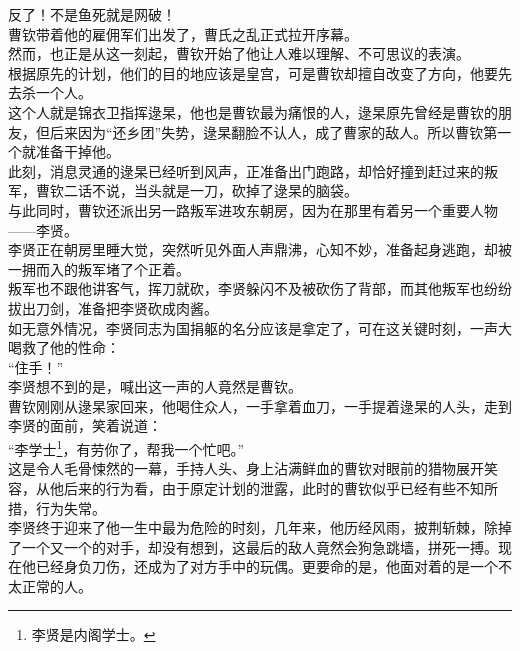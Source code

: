 \begin{multicols}{\theparacolNo}
反了！不是鱼死就是网破！\\

曹钦带着他的雇佣军们出发了，曹氏之乱正式拉开序幕。\\

然而，也正是从这一刻起，曹钦开始了他让人难以理解、不可思议的表演。\\

根据原先的计划，他们的目的地应该是皇宫，可是曹钦却擅自改变了方向，他要先去杀一个人。\\

这个人就是锦衣卫指挥逯杲，他也是曹钦最为痛恨的人，逯杲原先曾经是曹钦的朋友，但后来因为“还乡团”失势，逯杲翻脸不认人，成了曹家的敌人。所以曹钦第一个就准备干掉他。\\

此刻，消息灵通的逯杲已经听到风声，正准备出门跑路，却恰好撞到赶过来的叛军，曹钦二话不说，当头就是一刀，砍掉了逯杲的脑袋。\\

与此同时，曹钦还派出另一路叛军进攻东朝房，因为在那里有着另一个重要人物——李贤。\\

李贤正在朝房里睡大觉，突然听见外面人声鼎沸，心知不妙，准备起身逃跑，却被一拥而入的叛军堵了个正着。\\

叛军也不跟他讲客气，挥刀就砍，李贤躲闪不及被砍伤了背部，而其他叛军也纷纷拔出刀剑，准备把李贤砍成肉酱。\\

如无意外情况，李贤同志为国捐躯的名分应该是拿定了，可在这关键时刻，一声大喝救了他的性命：\\

“住手！”\\

李贤想不到的是，喊出这一声的人竟然是曹钦。\\

曹钦刚刚从逯杲家回来，他喝住众人，一手拿着血刀，一手提着逯杲的人头，走到李贤的面前，笑着说道：\\

“李学士\footnote{李贤是内阁学士。}，有劳你了，帮我一个忙吧。”\\

这是令人毛骨悚然的一幕，手持人头、身上沾满鲜血的曹钦对眼前的猎物展开笑容，从他后来的行为看，由于原定计划的泄露，此时的曹钦似乎已经有些不知所措，行为失常。\\

李贤终于迎来了他一生中最为危险的时刻，几年来，他历经风雨，披荆斩棘，除掉了一个又一个的对手，却没有想到，这最后的敌人竟然会狗急跳墙，拼死一搏。现在他已经身负刀伤，还成为了对方手中的玩偶。更要命的是，他面对着的是一个不太正常的人。\\


\end{multicols}
